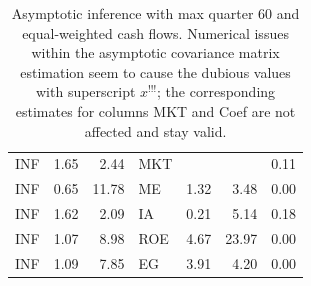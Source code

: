 \documentclass[12pt]{article}
\begin{document}
\begin{table}[ht]
\begin{tabular}{lrrlrrr}
		\hline
		INF & 1.65 & 2.44 & MKT &  &  & 0.11 \\ 
		INF & 0.65 & 11.78 & ME & 1.32 & 3.48 & 0.00 \\ 
		INF & 1.62 & 2.09 & IA & 0.21 & 5.14 & 0.18 \\ 
		INF & 1.07 & 8.98 & ROE & 4.67 & 23.97 & 0.00 \\ 
		INF & 1.09 & 7.85 & EG & 3.91 & 4.20 & 0.00 \\ 
		\hline
		\hline
	\end{tabular}
	\caption{
		Asymptotic inference with max quarter 60 and equal-weighted cash flows.
		Numerical issues within the asymptotic covariance matrix estimation seem to cause the dubious values with superscript $x^{!!!}$; the corresponding estimates for columns MKT and Coef are not affected and stay valid.
	}
	\label{tab:ai_60_ew_dep} 
\end{table}
\end{document}

